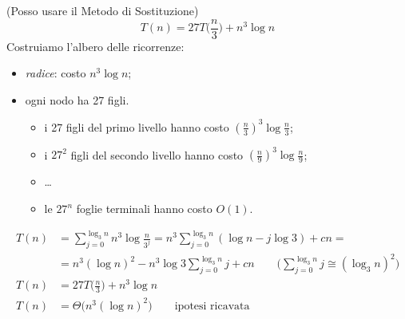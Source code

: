 \begin{itemize}[label=$\bullet$]
    (Posso usare il Metodo di Sostituzione)
    $$T(n) =  27T\Big(\frac{n}{3}\Big) + n^3 \log n$$
    Costruiamo l'albero delle ricorrenze:
    \begin{itemize}
        \item \emph{radice}: costo $n^3 \log n$;
        \item ogni nodo ha 27 figli.
        \begin{itemize}
            \item i 27 figli del primo livello hanno costo $(\frac{n}{3})^3 \log \frac{n}{3}$;
            \item i $27^2$ figli del secondo livello hanno costo $(\frac{n}{9})^3 \log \frac{n}{9}$;
            \item \dots
            \item le $27^n$ foglie terminali hanno costo $O(1)$.
        \end{itemize}
    \end{itemize}

    \begin{align*}
        T(n) & = \displaystyle\sum_{j=0}^{\log_3 n} n^3 \log \frac{n}{3^j} = 
            n^3 \displaystyle\sum_{j=0}^{\log_3 n}(\log n - j \log 3) + cn = \\
        & = n^3(\log n)^2 - n^3 \log 3 \displaystyle\sum_{j=0}^{\log_3 n}j + cn 
            \qquad \Big(\displaystyle\sum_{j=0}^{\log_3 n}j \cong (\log_3 n)^2 \Big) \\
        T(n) & = 27T\Big(\frac{n}{3}\Big) + n^3 \log n \\
        T(n) & = \Theta \big(n^3 (\log n)^2\big) \qquad \text{ipotesi ricavata}
    \end{align*}
    

\end{itemize}
